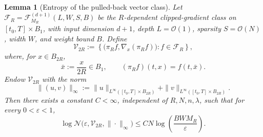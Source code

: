 \documentclass[11pt]{article}
\theoremstyle{plain}
\newtheorem{lemma}[theorem]{Lemma}
\theoremstyle{definition}
\theoremstyle{remark}
\begin{document}
\begin{lemma}[Entropy of the pulled-back vector class]
\label{lem:C6-vector-entropy}
Let \(\mathcal F_R=\mathcal F^{(d+1)}_{M_R}(L,W,S,B)\)  be the
\(R\)-dependent clipped-gradient class on \([t_0,T]\times B_1\), with
input dimension \(d+1\), depth \(L=\mathcal O(1)\), sparsity
\(S=\mathcal O(N)\), width \(W\), and weight bound \(B\). Define
\begin{equation}\label{eq: localized-time-dependent-set}
    \mathcal V_{2R}:=
\left\{
\bigl(\pi_R f,\nabla_x(\pi_R f)\bigr): f\in\mathcal F_R
\right\},
\end{equation}
where, for \(x\in B_{2R}\),
\[
\bar x:=\frac{x}{2R}\in B_1,
\qquad
(\pi_R f)(t,x)=f(t,\bar x).
\]
Endow \(\mathcal V_{2R}\) with the norm
\[
\|(u,v)\|_\infty
:=
\|u\|_{L^\infty([t_0,T]\times B_{2R})}
+
\|v\|_{L^\infty([t_0,T]\times B_{2R})}.
\]
Then there exists a constant \(C<\infty\), independent of
\(R,N,n,\lambda\), such that for every \(0<\varepsilon<1\),
\begin{equation}
\label{eq:C6_vector_entropy}
\log\mathcal N
\bigl(
\varepsilon,\mathcal V_{2R},\|\cdot\|_\infty
\bigr)
\le
C N
\log\left(\frac{BWM_R}{\varepsilon}\right).
\end{equation}
\end{lemma}
\end{document}
